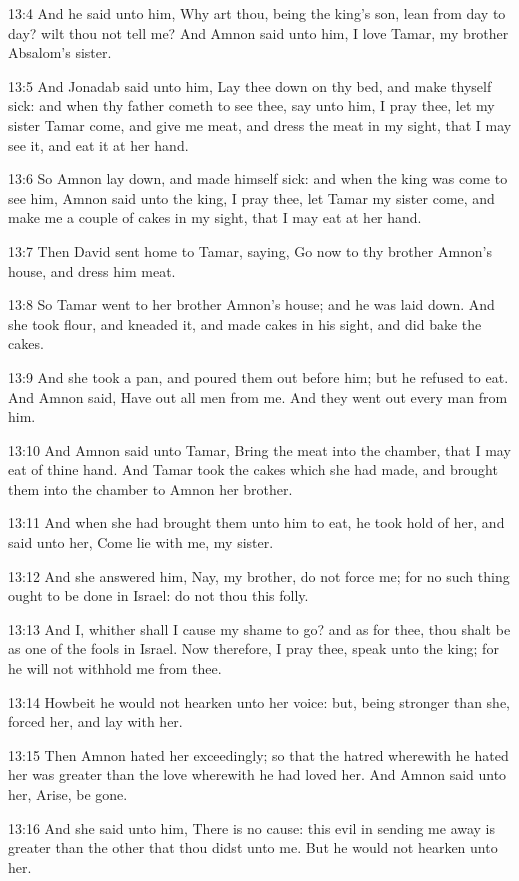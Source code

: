 13:4 And he said unto him, Why art thou, being the king's son, lean from day to day? wilt thou not tell me? And Amnon said unto him, I love Tamar, my brother Absalom's sister.

13:5 And Jonadab said unto him, Lay thee down on thy bed, and make thyself sick: and when thy father cometh to see thee, say unto him, I pray thee, let my sister Tamar come, and give me meat, and dress the meat in my sight, that I may see it, and eat it at her hand.

13:6 So Amnon lay down, and made himself sick: and when the king was come to see him, Amnon said unto the king, I pray thee, let Tamar my sister come, and make me a couple of cakes in my sight, that I may eat at her hand.

13:7 Then David sent home to Tamar, saying, Go now to thy brother Amnon's house, and dress him meat.

13:8 So Tamar went to her brother Amnon's house; and he was laid down.  And she took flour, and kneaded it, and made cakes in his sight, and did bake the cakes.

13:9 And she took a pan, and poured them out before him; but he refused to eat. And Amnon said, Have out all men from me. And they went out every man from him.

13:10 And Amnon said unto Tamar, Bring the meat into the chamber, that I may eat of thine hand. And Tamar took the cakes which she had made, and brought them into the chamber to Amnon her brother.

13:11 And when she had brought them unto him to eat, he took hold of her, and said unto her, Come lie with me, my sister.

13:12 And she answered him, Nay, my brother, do not force me; for no such thing ought to be done in Israel: do not thou this folly.

13:13 And I, whither shall I cause my shame to go? and as for thee, thou shalt be as one of the fools in Israel. Now therefore, I pray thee, speak unto the king; for he will not withhold me from thee.

13:14 Howbeit he would not hearken unto her voice: but, being stronger than she, forced her, and lay with her.

13:15 Then Amnon hated her exceedingly; so that the hatred wherewith he hated her was greater than the love wherewith he had loved her. And Amnon said unto her, Arise, be gone.

13:16 And she said unto him, There is no cause: this evil in sending me away is greater than the other that thou didst unto me. But he would not hearken unto her.

